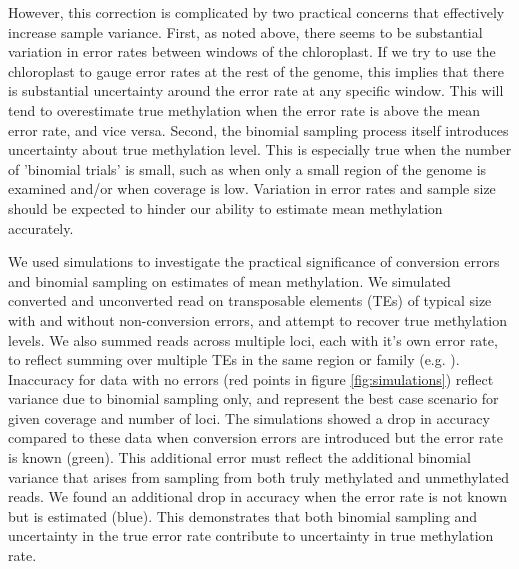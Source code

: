 \documentclass[12pt,longbibliography]{article}
\begin{document}
However, this correction is complicated by two practical concerns that effectively increase sample variance.
First, as noted above, there seems to be substantial variation in error rates between windows of the chloroplast.
If we try to use the chloroplast to gauge error rates at the rest of the genome, this implies that there is substantial uncertainty around the error rate at any specific window.
This will tend to overestimate true methylation when the error rate is above the mean error rate, and vice versa.
Second, the binomial sampling process itself introduces uncertainty about true methylation level.
This is especially true when the number of 'binomial trials' is small, such as when only a small region of the genome is examined and/or when coverage is low.
Variation in error rates and sample size should be expected to hinder our ability to estimate mean methylation accurately.

We used simulations to investigate the practical significance of conversion errors and binomial sampling on estimates of mean methylation.
We simulated converted and unconverted read on transposable elements (TEs) of typical size with and without non-conversion errors, and attempt to recover true methylation levels.
We also summed reads across multiple loci, each with it's own error rate, to reflect summing over multiple TEs in the same region or family (e.g. \cite{sasaki2019common}).
Inaccuracy for data with no errors (red points in figure \ref{fig:simulations}) reflect variance due to binomial sampling only, and represent the best case scenario for given coverage and number of loci.
The simulations showed a drop in accuracy compared to these data when conversion errors are introduced but the error rate is known (green).
This additional error must reflect the additional binomial variance that arises from sampling from both truly methylated and unmethylated reads.
We found an additional drop in accuracy when the error rate is not known but is estimated (blue).
This demonstrates that both binomial sampling and uncertainty in the true error rate contribute to uncertainty in true methylation rate.
\end{document}
